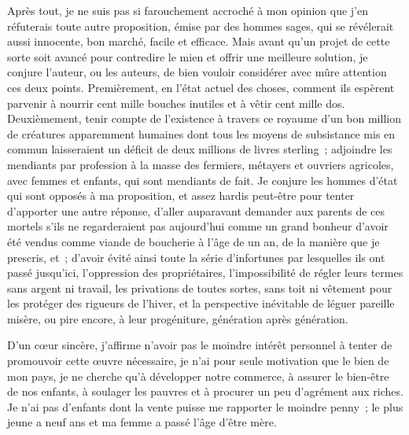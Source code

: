 \documentclass[french,twoside]{book} %
\newif\ifdev
\renewcommand{\LettrineFontHook}{\color{rubric}}
\newcommand{\initialiv}[2]{%
  \let\oldLFH\LettrineFontHook
  \IfSubStr{Q}{#1}{
    \lettrine[lines=4, lhang=0.2, loversize=-0.1, lraise=0.2]{\smash{#1}}{#2}
  }{\IfSubStr{É}{#1}{
    \lettrine[lines=4, lhang=0.2, loversize=-0, lraise=0]{\smash{#1}}{#2}
  }{\IfSubStr{ÀÂ}{#1}{
    \lettrine[lines=4, lhang=0.2, loversize=-0, lraise=0, slope=0.6em]{\smash{#1}}{#2}
  }{\IfSubStr{A}{#1}{
    \lettrine[lines=4, lhang=0.2, loversize=0.2, slope=0.6em]{\smash{#1}}{#2}
  }{\IfSubStr{V}{#1}{
    \lettrine[lines=4, lhang=0.2, loversize=0.2, slope=-0.5em]{\smash{#1}}{#2}
  }{
    \lettrine[lines=4, lhang=0.2, loversize=0.2]{\smash{#1}}{#2}
  }}}}}
  \let\LettrineFontHook\oldLFH
}
\renewcommand{\LettrineFontHook}{\bfseries\color{rubric}}
\begin{document}
Après tout, je ne suis pas si farouchement accroché à mon opinion que j’en réfuterais toute autre proposition, émise par des hommes sages, qui se révélerait aussi innocente, bon marché, facile et efficace. Mais avant qu’un projet de cette sorte soit avancé pour contredire le mien et offrir une meilleure solution, je conjure l’auteur, ou les auteurs, de bien vouloir considérer avec mûre attention ces deux points. Premièrement, en l’état actuel des choses, comment ils espèrent parvenir à nourrir cent mille bouches inutiles et à vêtir cent mille dos. Deuxièmement, tenir compte de l’existence à travers ce royaume d’un bon million de créatures apparemment humaines dont tous les moyens de subsistance mis en commun laisseraient un déficit de deux millions de livres sterling ; adjoindre les mendiants par profession à la masse des fermiers, métayers et ouvriers agricoles, avec femmes et enfants, qui sont mendiants de fait. Je conjure les hommes d’état qui sont opposés à ma proposition, et assez hardis peut-être pour tenter d’apporter une autre réponse, d’aller auparavant demander aux parents de ces mortels s’ils ne regarderaient pas aujourd’hui comme un grand bonheur d’avoir été vendus comme viande de boucherie à l’âge de un an, de la manière que je prescris, et ; d’avoir évité ainsi toute la série d’infortunes par lesquelles ils ont passé jusqu’ici, l’oppression des propriétaires, l’impossibilité de régler leurs termes sans argent ni travail, les privations de toutes sortes, sans toit ni vêtement pour les protéger des rigueurs de l’hiver, et la perspective inévitable de léguer pareille misère, ou pire encore, à leur progéniture, génération après génération.\par
D’un cœur sincère, j’affirme n’avoir pas le moindre intérêt personnel à tenter de promouvoir cette œuvre nécessaire, je n’ai pour seule motivation que le bien de mon pays, je ne cherche qu’à développer notre commerce, à assurer le bien-être de nos enfants, à soulager les pauvres et à procurer un peu d’agrément aux riches. Je n’ai pas d’enfants dont la vente puisse me rapporter le moindre penny ; le plus jeune a neuf ans et ma femme a passé l’âge d’être mère.
 


\ifbooklet
  \newpage\null\thispagestyle{empty}\newpage
\fi

\ifdev %
\fontname\font — \textsc{Les règles du jeu}\par
(\hyperref[utopie]{\underline{Lien}})\par
\noindent \initialiv{A}{lors là}\blindtext\par
\noindent \initialiv{À}{ la bonheur des dames}\blindtext\par
\noindent \initialiv{É}{tonnez-le}\blindtext\par
\noindent \initialiv{Q}{ualitativement}\blindtext\par
\noindent \initialiv{V}{aloriser}\blindtext\par
\Blindtext
\phantomsection
\label{utopie}
\Blinddocument
\fi
\end{document}
